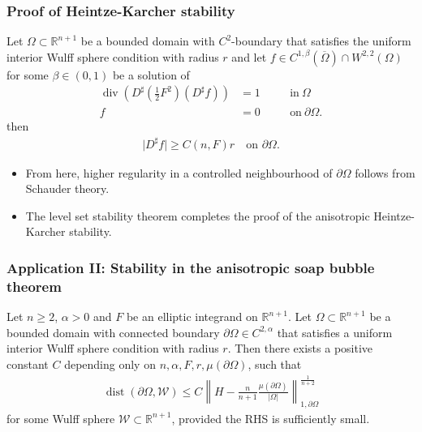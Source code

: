 \documentclass{beamer}
\newcommand{\sub}{\subset}
\newcommand{\bbR}{\mathbb{R}}
\newcommand{\8}{\infty}
\newcommand{\al}{\alpha}
\newcommand{\Om}{\Omega}
\newcommand{\cW}{\mathcal{W}}
\newcommand{\del}{\partial}
\newcommand{\tfr}[2]{\tfrac{#1}{#2}}
\DeclareMathOperator{\dive}{div}
\DeclareMathOperator{\dist}{dist}
\newcommand{\eq}[1]{\begin{equation}\begin{alignedat}{2} #1 \end{alignedat}\end{equation}}
\newcommand{\abs}[1]{\lvert #1\rvert}
\newcommand{\q}{\quad}
\begin{document}
\begin{frame} 
\frametitle{Proof of Heintze-Karcher stability}


\begin{lemma}[Gradient bound on $\del\Om$]\label{Lem-IWC-bound}
Let $\Om\subset\mathbb{R}^{n+1}$ be a bounded domain with  $C^{2}$-boundary that satisfies the uniform interior Wulff sphere condition with radius $r$ and let $f\in C^{1,\beta}(\overline\Om)\cap W^{2,2}(\Om)$ for some $\beta\in(0,1)$ be a solution of
 \eq{\dive(D^{\sharp}(\tfr 12 F^{2})(D^{\sharp }f)) &=1\q &&\mbox{in}~\Om\\
	f&=0\q &&\mbox{on}~\del\Om.}
then
\eq{
\vert D^\sharp f\vert
    \geq C(n,F)r\quad\text{on }\del\Om.
}
\end{lemma}

\begin{itemize}
\item From here, higher regularity in a controlled neighbourhood of $\del\Om$ follows from Schauder theory.
\item The level set stability theorem completes the proof of the anisotropic Heintze-Karcher stability.
\end{itemize}

\end{frame}


\begin{frame} 
\frametitle{Application II: Stability in the anisotropic soap bubble theorem}

\begin{theorem}
Let $n\geq 2$, $\al>0$ and $F$ be an elliptic integrand on $\mathbb{R}^{n+1}$.
Let $\Om\sub \bbR^{n+1}$ be a bounded domain with connected boundary $\del\Om\in C^{2,\al}$ that satisfies a uniform interior Wulff sphere condition with radius $r$. 
Then there exists a positive constant $C$ depending only on $n,\al,F,r,\mu(\del\Om)$, such that 
\eq{
\dist(\del\Om,{\cW})
    \leq C
    \left\|H-\tfr{n}{n+1}\tfr{\mu(\del\Om)}{\abs{\Om}}\right\|_{1,\del\Om}^{\frac{1}{n+2}}
}
for some Wulff sphere ${\cW}\subset\mathbb{R}^{n+1}$, provided the RHS is sufficiently small.
\end{theorem}
\end{frame}
\end{document}
